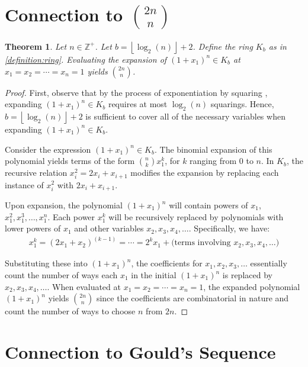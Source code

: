 \documentclass{article}
\theoremstyle{plain}
\theoremstyle{definition}
\newtheorem{theorem}{Theorem}
\newcommand{\floor}[1]{\left\lfloor #1 \right\rfloor}
\newcommand{\Z}{\mathbb{Z}}
\newcommand{\K}{K}
\begin{document}
\section[Connection to Central Binomial Coefficients]{Connection to $\binom{2n}{n}$} \label{section:cbc}
\begin{theorem} \label{theorem:cbc}
\textit{
Let $n \in \Z^+$. Let $b={\floor{\log_2(n)}+2}$. Define the ring $\K_b$ as in \cref{definition:ring}. Evaluating the expansion of $(1+x_1)^n \in \K_b$ at $x_1=x_2=\cdots=x_n=1$ yields $\binom{2n}{n}$.
}
\end{theorem}
\begin{proof}
First, observe that by the process of exponentiation by squaring \cite{knuth1997art}, expanding $(1+x_1)^n \in \K_b$ requires at most $\log_2(n)$ squarings. Hence, $b={\floor{\log_2(n)}+2}$ is sufficient to cover all of the necessary variables when expanding $(1+x_1)^n \in \K_b$.

Consider the expression $(1+x_1)^n \in \K_b$. The binomial expansion of this polynomial yields terms of the form $\binom{n}{k} x_1^k$, for $k$ ranging from $0$ to $n$. In $\K_b$, the recursive relation $x_i^2 = 2x_i + x_{i+1}$ modifies the expansion by replacing each instance of $x_i^2$ with $2x_i + x_{i+1}$.

Upon expansion, the polynomial $(1+x_1)^n$ will contain powers of $x_1$, $x_1^2, x_1^3, \ldots, x_1^n$. Each power $x_1^k$ will be recursively replaced by polynomials with lower powers of $x_1$ and other variables $x_2, x_3, x_4, \ldots$. Specifically, we have:
\begin{align}
    x_1^k = (2x_1+x_2)^{(k-1)} = \cdots = 2^k x_1 + \text{(terms involving $x_2, x_3, x_4, \ldots$)}
\end{align}

Substituting these into $(1+x_1)^n$, the coefficients for $x_1, x_2, x_3, \ldots$ essentially count the number of ways each $x_1$ in the initial $(1+x_1)^n$ is replaced by $x_2, x_3, x_4, \ldots$. When evaluated at $x_1=x_2=\cdots=x_n=1$, the expanded polynomial $(1+x_1)^n$ yields $\binom{2n}{n}$ since the coefficients are combinatorial in nature and count the number of ways to choose $n$ from $2n$.
\end{proof}

\section{Connection to Gould's Sequence} \label{section:goulds}
\end{document}
